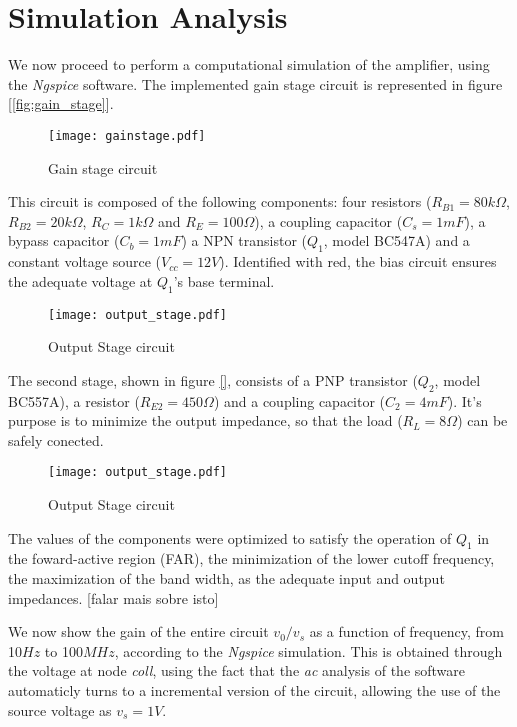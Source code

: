 \section{Simulation Analysis}
\label{sec:simulation}

\par We now proceed to perform a computational simulation of the amplifier, using the \textit{Ngspice} software. The implemented gain stage circuit is represented in figure [\ref{fig:gain_stage}].

\begin{figure}[H]
\centering
  \texttt{[image: gainstage.pdf]}
  \caption{Gain stage circuit}
  \label{fig:gain_Stage}
\end{figure}

\par This circuit is composed of the following components: four resistors ($R_{B1}=80k\Omega$, $R_{B2}=20k\Omega$, $R_{C}=1k\Omega$ and $R_{E}=100\Omega$), a coupling capacitor ($C_s = 1 mF$), a bypass capacitor ($C_b=1mF$) a NPN transistor ($Q_1$, model BC547A) and a constant voltage source ($V_{cc}=12V$). Identified with red, the bias circuit ensures the adequate voltage at $Q_1$'s base terminal.

\begin{figure}[H]
\centering
  \texttt{[image: output\_stage.pdf]}
  \caption{Output Stage circuit}
  \label{fig:output_stage}
\end{figure}

\par The second stage, shown in figure \ref{}, consists of a PNP transistor ($Q_2$, model BC557A), a resistor ($R_{E2}=450\Omega$) and a coupling capacitor ($C_2=4mF$). It's purpose is to minimize the output impedance, so that the load ($R_L=8\Omega$) can be safely conected.

\begin{figure}[H]
\centering
  \texttt{[image: output\_stage.pdf]}
  \caption{Output Stage circuit}
  \label{fig:output_stage}
\end{figure}

\par The values of the components were optimized to satisfy the operation of $Q_1$ in the foward-active region (FAR), the minimization of the lower cutoff frequency, the maximization of the band width, as the adequate input and output impedances. [falar mais sobre isto]

\par We now show the gain of the entire circuit $v_0 / v_s$ as a function of frequency, from 10$Hz$ to 100$MHz$, according to the \textit{Ngspice} simulation. This is obtained through the voltage at node \textit{coll}, using the fact that the \textit{ac} analysis of the software automaticly turns to a incremental version of the circuit, allowing the use of the source voltage as $v_s = 1V$.

